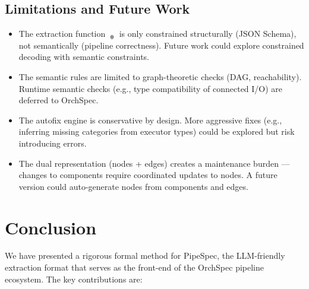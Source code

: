 \documentclass[11pt,a4paper]{article}
\theoremstyle{definition}
\DeclareMathOperator{\ExtractLLM}{\mathcal{E}_{\bm\theta}}
\begin{document}
\subsection{Limitations and Future Work}
\begin{itemize}[leftmargin=*]
    \item The extraction function $\ExtractLLM_{\bm\theta}$ is only constrained structurally (JSON Schema), not semantically (pipeline correctness). Future work could explore constrained decoding with semantic constraints.
    \item The semantic rules are limited to graph-theoretic checks (DAG, reachability). Runtime semantic checks (e.g., type compatibility of connected I/O) are deferred to OrchSpec.
    \item The autofix engine is conservative by design. More aggressive fixes (e.g., inferring missing categories from executor types) could be explored but risk introducing errors.
    \item The dual representation (nodes + edges) creates a maintenance burden — changes to components require coordinated updates to nodes. A future version could auto-generate nodes from components and edges.
\end{itemize}

\section{Conclusion}

We have presented a rigorous formal method for PipeSpec, the LLM-friendly extraction format that serves as the front-end of the OrchSpec pipeline ecosystem. The key contributions are:
\end{document}
